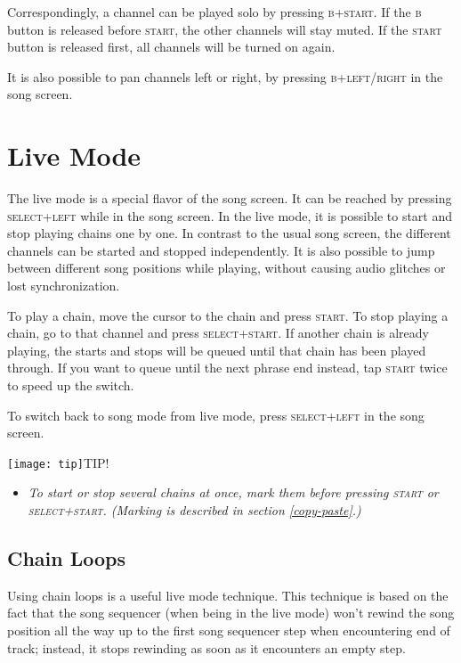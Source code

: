 Correspondingly, a channel can be played solo by pressing \textsc{b+start}. If the \textsc{b} button is released before \textsc{start}, the other channels will stay muted. If the \textsc{start} button is released first, all channels will be turned on again.

It is also possible to pan channels left or right, by pressing \textsc{b+left/right} in the song screen.

\section{Live Mode}

 The live mode is a special flavor of the song screen. It can be reached by pressing \textsc{select+left} while in the song screen. In the live mode, it is possible to start and stop playing chains one by one. In contrast to the usual song screen, the different channels can be started and stopped independently. It is also possible to jump between different song positions while playing, without causing audio glitches or lost synchronization.

To play a chain, move the cursor to the chain and press \textsc{start}. To stop playing a chain, go to that channel and press \textsc{select+start}. If another chain is already playing, the starts and stops will be queued until that chain has been played through. If you want to queue until the next phrase end instead, tap \textsc{start} twice to speed up the switch.

To switch back to song mode from live mode, press \textsc{select+left} in the song screen.

\texttt{[image: tip]}TIP!
\begin{itemize}
        \item \textit{To start or stop several chains at once, mark them before pressing \textsc{start} or \textsc{select+start}. (Marking is described in section \ref{copy-paste}.)}
	\end{itemize}

\subsection{Chain Loops}

 Using chain loops is a useful live mode technique. This technique is based on the fact that the song sequencer (when being in the live mode) won't rewind the song position all the way up to the first song sequencer step when encountering end of track; instead, it stops rewinding as soon as it encounters an empty step.

